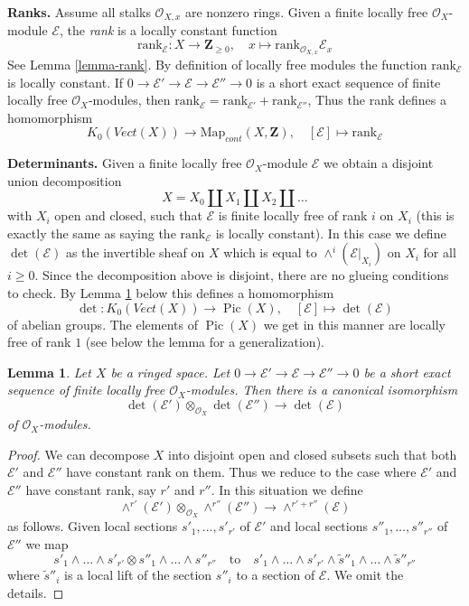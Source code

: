 \documentclass{stacks-project}
\theoremstyle{plain}
\newtheorem{lemma}[subsection]{Lemma}
\theoremstyle{definition}
\theoremstyle{remark}
\numberwithin{equation}{subsection}
\def\Pic{\mathop{\mathrm{Pic}}\nolimits}
\begin{document}
\medskip\noindent
{\bf Ranks.} Assume all stalks $\mathcal{O}_{X, x}$ are nonzero rings.
Given a finite locally free $\mathcal{O}_X$-module $\mathcal{E}$,
the {\it rank} is a locally constant function
$$
\text{rank}_\mathcal{E} : X \longrightarrow \mathbf{Z}_{\geq 0},\quad
x \longmapsto \text{rank}_{\mathcal{O}_{X, x}} \mathcal{E}_x
$$
See Lemma \ref{lemma-rank}. By definition of locally free
modules the function $\text{rank}_\mathcal{E}$ is locally constant. If 
$0 \to \mathcal{E}' \to \mathcal{E} \to \mathcal{E}'' \to 0$
is a short exact sequence of finite locally free $\mathcal{O}_X$-modules,
then $\text{rank}_\mathcal{E} = \text{rank}_{\mathcal{E}'} +
\text{rank}_{\mathcal{E}''}$,
Thus the rank defines a homomorphism
$$
K_0(\textit{Vect}(X)) \longrightarrow \text{Map}_{cont}(X, \mathbf{Z}),\quad
[\mathcal{E}] \longmapsto \text{rank}_\mathcal{E}
$$

\medskip\noindent
{\bf Determinants.} Given a  finite locally free
$\mathcal{O}_X$-module $\mathcal{E}$ we obtain a disjoint union
decomposition
$$
X = X_0 \amalg X_1 \amalg X_2 \amalg \ldots
$$
with $X_i$ open and closed, such that $\mathcal{E}$ is finite locally
free of rank $i$ on $X_i$ (this is exactly the same as saying the
$\text{rank}_\mathcal{E}$ is locally constant). In this case we define
$\det(\mathcal{E})$ as the invertible sheaf on $X$ which is equal to
$\wedge^i(\mathcal{E}|_{X_i})$ on $X_i$ for all $i \geq 0$.
Since the decomposition above is disjoint, there are no glueing
conditions to check. By Lemma \ref{lemma-det-ses} below
this defines a homomorphism
$$
\det : K_0(\textit{Vect}(X)) \longrightarrow \Pic(X),\quad
[\mathcal{E}] \longmapsto \det(\mathcal{E})
$$
of abelian groups. The elements of $\Pic(X)$ we get in this manner
are locally free of rank $1$ (see below the lemma for a generalization).

\begin{lemma}
\label{lemma-det-ses}
Let $X$ be a ringed space. Let
$0 \to \mathcal{E}' \to \mathcal{E} \to \mathcal{E}'' \to 0$
be a short exact sequence of finite locally free $\mathcal{O}_X$-modules.
Then there is a canonical isomorphism
$$
\det(\mathcal{E}') \otimes_{\mathcal{O}_X}\det(\mathcal{E}'')
\longrightarrow
\det(\mathcal{E})
$$
of $\mathcal{O}_X$-modules.
\end{lemma}

\begin{proof}
We can decompose $X$ into disjoint open and closed subsets such that
both $\mathcal{E}'$ and $\mathcal{E}''$ have constant rank on them.
Thus we reduce to the case where $\mathcal{E}'$ and $\mathcal{E}''$
have constant rank, say $r'$ and $r''$. In this situation we
define
$$
\wedge^{r'}(\mathcal{E}') \otimes_{\mathcal{O}_X} \wedge^{r''}(\mathcal{E}'')
\longrightarrow
\wedge^{r' + r''}(\mathcal{E})
$$
as follows. Given local sections $s'_1, \ldots, s'_{r'}$ of $\mathcal{E}'$
and local sections $s''_1, \ldots, s''_{r''}$ of $\mathcal{E}''$
we map
$$
s'_1 \wedge \ldots \wedge s'_{r'} \otimes
s''_1 \wedge \ldots \wedge s''_{r''}
\quad\text{to}\quad
s'_1 \wedge \ldots \wedge s'_{r'} \wedge
\tilde s''_1 \wedge \ldots \wedge \tilde s''_{r''}
$$
where $\tilde s''_i$ is a local lift of the section
$s''_i$ to a section of $\mathcal{E}$. We omit the details.
\end{proof}
\end{document}
